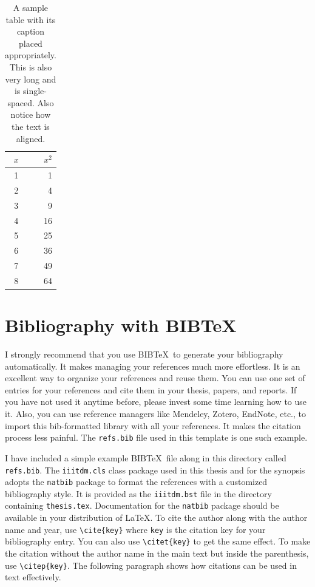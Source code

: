 \begin{table}[htbp]
  \caption{A sample table with its caption placed appropriately. This is also very long and is single-spaced. Also notice how the text is aligned.}
  \begin{center}
  \begin{tabular}[c]{|c|r|} \hline
    $x$ & $x^2$ \\ \hline
    1  &  1   \\
    2  &  4  \\
    3  &  9  \\
    4  &  16  \\
    5  &  25  \\
    6  &  36  \\
    7  &  49  \\
    8  &  64  \\ \hline
  \end{tabular}
  \label{tab:sample}
  \end{center}
\end{table}

\section{Bibliography with BIB\TeX}

I strongly recommend that you use BIB\TeX\ to generate your bibliography automatically.  It makes managing your references much more effortless.  It is an excellent way to organize your references and reuse them. You can use one set of entries for your references and cite them in your thesis, papers, and reports.  If you have not used it anytime before, please invest some time learning how to use it. Also, you can use reference managers like Mendeley, Zotero, EndNote, etc., to import this bib-formatted library with all your references. It makes the citation process less painful. The \verb+refs.bib+ file used in this template is one such example.

I have included a simple example BIB\TeX\ file along in this directory called \verb+refs.bib+.  The \verb+iiitdm.cls+ class package used in this thesis and for the synopsis adopts the \verb+natbib+ package to format the references with a customized bibliography style. It is provided as the \verb+iiitdm.bst+ file in the directory containing \verb+thesis.tex+.  Documentation for the \verb+natbib+ package should be available in your distribution of \LaTeX.  To cite the author along with the author name and year, use \verb+\cite{key}+ where \verb+key+ is the citation key for your bibliography entry.  You can also use \verb+\citet{key}+ to get the same effect.  To make the citation without the author name in the main text but inside the parenthesis, use \verb+\citep{key}+.  The following paragraph shows how citations can be used in text effectively.

